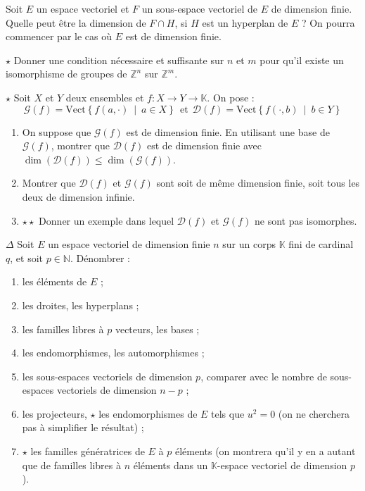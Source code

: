 \documentclass[french,a4paper]{article}
\newcommand{\N}{\mathbb{N}}
\newcommand{\Z}{\mathbb{Z}}
\newcommand{\K}{\mathbb{K}}
\theoremstyle{plain}
\theoremstyle{definition}
\theoremstyle{remark}
\begin{document}
\begin{ex}[Moulin.EV.22]{}
	Soit $E$ un espace vectoriel et $F$ un sous-espace vectoriel de $E$ de dimension finie. Quelle peut être la dimension de $F\cap H$, si $H$ est un hyperplan de $E$ ? On pourra commencer par le cas où $E$ est de dimension finie.
\end{ex}

\begin{ex}[Moulin.EV.23]{$\star$}
	Donner une condition nécessaire et suffisante sur $n$ et $m$ pour qu'il existe un isomorphisme de groupes de $\Z^n$ sur $\Z^m$.
\end{ex}

\begin{ex}[Moulin.EV.24]{$\star$}
	Soit $X$ et $Y$ deux ensembles et $f:X\to Y\to\K$. On pose : $$\mathcal{G}(f)=\text{Vect}\left\{f(a,\cdot)\ \mid\ a\in X\right\}\ \ \text{et}\ \ \mathcal{D}(f)=\text{Vect}\left\{f(\cdot,b)\ \mid\ b\in Y\right\}$$
	\begin{enumerate}
		\item On suppose que $\mathcal{G}(f)$ est de dimension finie. En utilisant une base de $\mathcal{G}(f)$, montrer que $\mathcal{D}(f)$ est de dimension finie avec $\dim(\mathcal{D}(f))\leqslant\dim(\mathcal{G}(f))$.
		\item Montrer que $\mathcal{D}(f)$ et $\mathcal{G}(f)$ sont soit de même dimension finie, soit tous les deux de dimension infinie.
		\item $\star\star$ Donner un exemple dans lequel $\mathcal{D}(f)$ et $\mathcal{G}(f)$ ne sont pas isomorphes.
	\end{enumerate}
\end{ex}

\begin{ex}[Moulin.EV.25]{$\Delta$}
	Soit $E$ un espace vectoriel de dimension finie $n$ sur un corps $\K$ fini de cardinal $q$, et soit $p\in\N$. Dénombrer :
	\begin{enumerate}
		\item les éléments de $E$ ;
		\item les droites, les hyperplans ;
		\item les familles libres à $p$ vecteurs, les bases ;
		\item les endomorphismes, les automorphismes ;
		\item les sous-espaces vectoriels de dimension $p$, comparer avec le nombre de sous-espaces vectoriels de dimension $n-p$ ;
		\item les projecteurs, $\star$ les endomorphismes de $E$ tels que $u^2=0$ (on ne cherchera pas à simplifier le résultat) ;
		\item $\star$ les familles génératrices de $E$ à $p$ éléments (on montrera qu'il y en a autant que de familles libres à $n$ éléments dans un $\K$-espace vectoriel de dimension $p$).
	\end{enumerate}
\end{ex}
\end{document}

